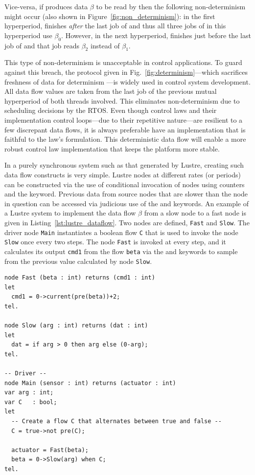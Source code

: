 Vice-versa, if \tl produces data $\beta$ to be read by \ts then the
following non-determinism might occur (also shown in
Figure~\ref{fig:non_determinism}): in the first hyperperiod, \tl
finishes \emph{after} the last job of \ts and thus all three jobs of
\ts in this hyperperiod use $\beta_0$. However, in the next
hyperperiod, \tl finishes just before the last job of \ts and that job
reads $\beta_2$ instead of $\beta_1$.

This type of non-determinism is unacceptable in control
applications. To guard against this breach, the protocol given in
Fig.~\ref{fig:determinism}---which sacrifices freshness of data for
determinism ---is widely used in control system development. All data
flow values are taken from the last job of the previous mutual
hyperperiod of both threads involved. This eliminates non-determinism
due to scheduling decisions by the RTOS. Even though control laws and
their implementation control loops---due to their repetitive
nature---are resilient to a few discrepant data flows, it is always
preferable have an implementation that is faithful to the law's
formulation. This deterministic data flow will enable a more robust
control law implementation that keeps the platform more stable.

In a purely synchronous system such as that generated by Lustre,
creating such data flow constructs is very simple. Lustre nodes at
different rates (or periods) can be constructed via the use of
conditional invocation of nodes using counters and the 
keyword. Previous data from source nodes that are slower than the node
in question can be accessed via judicious use of the  and
 keywords. An example of a Lustre system to implement the
data flow $\beta$ from a slow node to a fast node is given in
Listing~\ref{lst:lustre_dataflow}. Two nodes are defined,
\texttt{Fast} and \texttt{Slow}. The driver node \texttt{Main}
instantiates a boolean flow \texttt{C} that is used to invoke the node
\texttt{Slow} once every two steps. The node \texttt{Fast} is invoked
at every step, and it calculates its output \texttt{cmd1} from the
flow \texttt{beta} via the  and  keywords to
sample from the previous value calculated by node \texttt{Slow}.

\begin{minipage}{\listingwidth}
\begin{center}
\begin{lstlisting}[language=lustre, label=lst:lustre_dataflow,
    caption=A slow to fast node deterministic data flow in Lustre]
node Fast (beta : int) returns (cmd1 : int)
let
  cmd1 = 0->current(pre(beta))+2;
tel.

node Slow (arg : int) returns (dat : int)
let
  dat = if arg > 0 then arg else (0-arg);
tel.  

-- Driver --
node Main (sensor : int) returns (actuator : int)
var arg : int;
var C   : bool;
let
  -- Create a flow C that alternates between true and false --
  C = true->not pre(C);

  actuator = Fast(beta);
  beta = 0->Slow(arg) when C;
tel.
\end{lstlisting}
\end{center}
\end{minipage}

